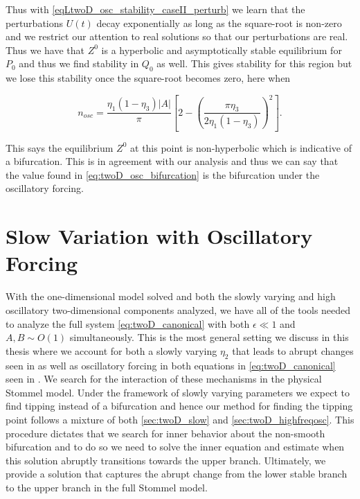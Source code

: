 Thus with \eqref{eqLtwoD_osc_stability_caseII_perturb} we learn that the perturbations $U(t)$ decay exponentially as long as the square-root is non-zero and we restrict our attention to real solutions so that our perturbations are real. Thus we have that $Z^0$ is a hyperbolic and asymptotically stable equilibrium for $P_0$ and thus we find stability in $Q_0$ as well. This gives stability for this region but we lose this stability once the square-root becomes zero, here when

\begin{equation*}
n_{osc} = \frac{\eta_1(1-\eta_3)|A|}{\pi}\left[2-\left(\frac{\pi\eta_3}{2\eta_1(1-\eta_3)}\right)^2\right].
\end{equation*}

This says the equilibrium $Z^0$ at this point is non-hyperbolic which is indicative of a bifurcation. This is in agreement with our analysis and thus we can say that the value found in \eqref{eq:twoD_osc_bifurcation} is the bifurcation under the oscillatory forcing.


\section{Slow Variation with Oscillatory Forcing}
\label{sec:twoD_slowosc}

With the one-dimensional model solved and both the slowly varying and high oscillatory two-dimensional components analyzed, we have all of the tools needed to analyze the full system \eqref{eq:twoD_canonical} with both $\epsilon \ll 1$ and $A,B\sim O(1)$ simultaneously. This is the most general setting we discuss in this thesis where we account for both a slowly varying $\eta_2$ that leads to abrupt changes seen in \cite{alley2003abrupt,marotzke2000abrupt,rahmstorf2000thermohaline} as well as oscillatory forcing in both equations in \eqref{eq:twoD_canonical} seen in \cite{roberts2017relaxation,huybers2005obliquity}. We search for the interaction of these mechanisms in the physical Stommel model. Under the framework of slowly varying parameters we expect to find tipping instead of a bifurcation and hence our method for finding the tipping point follows a mixture of both \autoref{sec:twoD_slow} and \autoref{sec:twoD_highfreqosc}. This procedure dictates that we search for inner behavior about the non-smooth bifurcation and to do so we need to solve the inner equation and estimate when this solution abruptly transitions towards the upper branch. Ultimately, we provide a solution that captures the abrupt change from the lower stable branch to the upper branch in the full Stommel model.

